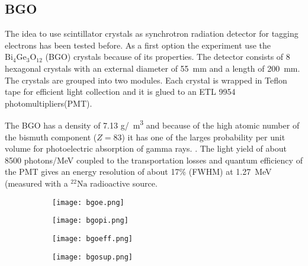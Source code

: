 \subsection{BGO}\label{bgoanal}

The idea to use scintillator crystals as synchrotron radiation detector for tagging electrons has been tested
before\cite{bgosync}. As a first option the experiment use the $\mathrm{Bi_4Ge_3O_{12}}$ (BGO) crystals because of its
properties. The detector consists of 8 hexagonal crystals with an external diameter of \SI{55}{mm} and a length of
\SI{200}{mm}. The crystals are grouped into two modules. Each crystal is wrapped in Teflon tape for efficient light
collection and it is glued to an ETL 9954 photomultipliers(PMT).\par

The BGO has a density of 7.13 \si{\gram/\centi\cubic\metre} and because of the high atomic number of the bismuth
component ($Z=83$) it has one of the larges probability per unit volume for photoelectric absorption of gamma rays.
\cite{bgodatashet}. The light yield of about 8500 photons/MeV coupled to the transportation losses and
quantum efficiency of the PMT gives an energy resolution of about 17\% (FWHM) at \SI{1.27}{MeV} (measured with a
$\mathrm{^{22}Na}$ radioactive source.\par


\begin{figure}[ht]
		\centering
		\hspace*{\fill}
		\begin{subfigure}[b]{0.45\textwidth}
			\centering
			\texttt{[image: bgoe.png]}
			\caption{}\label{}
		\end{subfigure}
		\hfill
		\begin{subfigure}[b]{0.45\textwidth}
			\centering
			\texttt{[image: bgopi.png]}
			\caption{}\label{}
		\end{subfigure}
		\hspace*{\fill}
		\caption{}\label{}
\end{figure}
\begin{figure}[ht]
		\centering
		\hspace*{\fill}
		\begin{subfigure}[b]{0.45\textwidth}
			\centering
			\texttt{[image: bgoeff.png]}
			\caption{}\label{}
		\end{subfigure}
		\hfill
		\begin{subfigure}[b]{0.45\textwidth}
			\centering
			\texttt{[image: bgosup.png]}
			\caption{}\label{}
		\end{subfigure}
		\hspace*{\fill}
		\caption{}\label{}
\end{figure}


